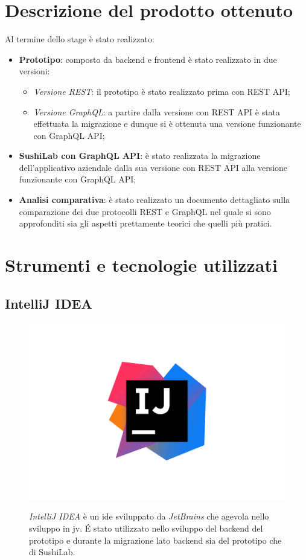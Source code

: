 \section{Descrizione del prodotto ottenuto}
Al termine dello stage è stato realizzato:
\begin{itemize}
  \item \textbf{Prototipo}: composto da backend e frontend è stato realizzato in due versioni:
  \begin{itemize}
    \item \textit{Versione REST}: il prototipo è stato realizzato prima con REST API;
    \item \textit{Versione GraphQL}: a partire dalla versione con REST API è stata effettuata la migrazione e dunque si è ottenuta una versione funzionante con GraphQL API;
  \end{itemize}
  \item \textbf{SushiLab con GraphQL API}: è stato realizzata la migrazione dell'applicativo aziendale dalla sua versione con REST API alla versione funzionante con GraphQL API;
  \item \textbf{Analisi comparativa}: è stato realizzato un documento dettagliato sulla comparazione dei due protocolli REST e GraphQL nel quale si sono approfonditi sia gli aspetti prettamente teorici che quelli più pratici.
\end{itemize}
\newpage
\section{Strumenti e tecnologie utilizzati}
\subsection*{IntelliJ IDEA}
\begin{figure}[ht]
  \begin{minipage}[h]{0.3\linewidth}
    \centering
    \includegraphics[width=0.9\linewidth]{immagini/IntelliJ.png}
  \end{minipage}
  \begin{minipage}[!h]{0.7\linewidth}
    \textit{IntelliJ IDEA} è un \gls{ide} sviluppato da \textit{JetBrains} che agevola nello sviluppo in \gls{jv}.
    É stato utilizzato nello sviluppo del backend del prototipo e durante la migrazione lato backend sia del prototipo che di SushiLab.
  \end{minipage}
\end{figure}
